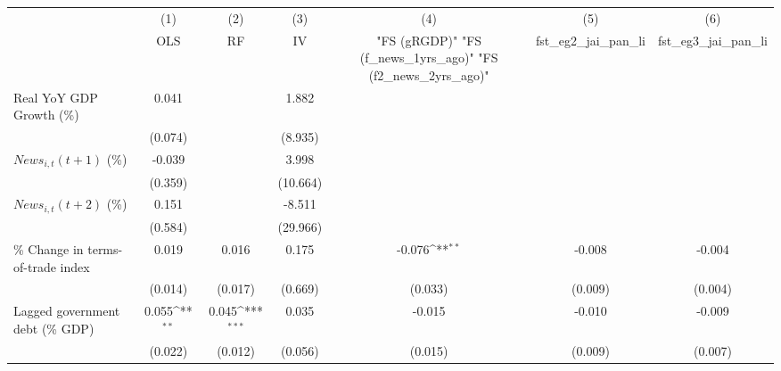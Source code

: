 {
\def\sym#1{\ifmmode^{#1}\else\(^{#1}\)\fi}
\begin{tabular}{l*{6}{c}}
\toprule
                    &\multicolumn{1}{c}{(1)}&\multicolumn{1}{c}{(2)}&\multicolumn{1}{c}{(3)}&\multicolumn{1}{c}{(4)}&\multicolumn{1}{c}{(5)}&\multicolumn{1}{c}{(6)}\\
                    &\multicolumn{1}{c}{OLS}&\multicolumn{1}{c}{RF}&\multicolumn{1}{c}{IV}&\multicolumn{1}{c}{ "FS (gRGDP)"  "FS (f_news_1yrs_ago)"  "FS (f2_news_2yrs_ago)" }&\multicolumn{1}{c}{fst_eg2_jai_pan_li}&\multicolumn{1}{c}{fst_eg3_jai_pan_li}\\
\midrule
Real YoY GDP Growth (\%)&       0.041         &                     &       1.882         &                     &                     &                     \\
                    &     (0.074)         &                     &     (8.935)         &                     &                     &                     \\
\addlinespace
$ News_{i,t}(t+1)$ (\%)&      -0.039         &                     &       3.998         &                     &                     &                     \\
                    &     (0.359)         &                     &    (10.664)         &                     &                     &                     \\
\addlinespace
$ News_{i,t}(t+2)$ (\%)&       0.151         &                     &      -8.511         &                     &                     &                     \\
                    &     (0.584)         &                     &    (29.966)         &                     &                     &                     \\
\addlinespace
\% Change in terms-of-trade index&       0.019         &       0.016         &       0.175         &      -0.076\sym{**} &      -0.008         &      -0.004         \\
                    &     (0.014)         &     (0.017)         &     (0.669)         &     (0.033)         &     (0.009)         &     (0.004)         \\
\addlinespace
Lagged government debt (\% GDP)&       0.055\sym{**} &       0.045\sym{***}&       0.035         &      -0.015         &      -0.010         &      -0.009         \\
                    &     (0.022)         &     (0.012)         &     (0.056)         &     (0.015)         &     (0.009)         &     (0.007)         \\

\end{tabular}}
